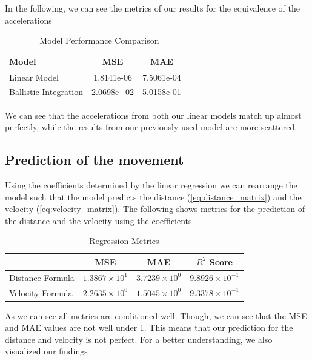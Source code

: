 In the following, we can see the metrics of our results for the equivalence of the accelerations

\begin{table}[htbp]
\centering
\caption{Model Performance Comparison}
\label{tab:model_comparison_lin_v_bal}
\begin{tabular}{lccc}
\toprule
Model & MSE & MAE \\
\midrule
Linear Model & 1.8141e-06 & 7.5061e-04 \\
Ballistic Integration & 2.0698e+02 & 5.0158e-01 \\
\bottomrule
\end{tabular}
\end{table}

We can see that the accelerations from both our linear models match up almost perfectly, while the 
results from our previously used model are more scattered. 

\subsection{Prediction of the movement}
Using the coefficients determined by the linear regression we can rearrange the model such that the model predicts 
the distance (\ref{eq:distance_matrix}) and the velocity (\ref{eq:velocity_matrix}).
The following shows metrics for the prediction of the distance and the velocity using the coefficients.

\begin{table}[t]
    \centering
    \caption{Regression Metrics}
    \begin{tabular}{lccc}
    \toprule
 & {MSE} & {MAE} & {$R^2$ Score} \\
    \midrule
    Distance Formula & $1.3867 \times 10^{1}$ & $3.7239 \times 10^{0}$ & $9.8926 \times 10^{-1}$ \\
    Velocity Formula & $2.2635 \times 10^{0}$ & $1.5045 \times 10^{0}$ & $9.3378 \times 10^{-1}$ \\
    \bottomrule
    \end{tabular}
    \label{tab:regression_metrics}
\end{table}


As we can see all metrics are conditioned well. 
Though, we can see that the MSE and MAE values are not well under 1.
This means that our prediction for the distance and velocity is not perfect. 
For a better understanding, we also visualized our findings

